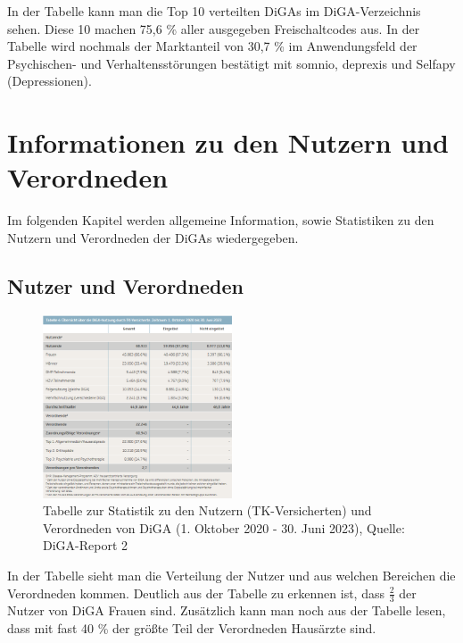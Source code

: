 \documentclass{article}
\begin{document}
			In der Tabelle kann man die Top 10 verteilten DiGAs im DiGA-Verzeichnis sehen. Diese 10 machen 75,6 \% aller ausgegeben Freischaltcodes aus. In der Tabelle wird nochmals der Marktanteil von 30,7 \% im Anwendungsfeld der Psychischen- und Verhaltensstörungen bestätigt mit somnio, deprexis und Selfapy (Depressionen).  
	
	\section{Informationen zu den Nutzern und Verordneden}
		Im folgenden Kapitel werden allgemeine Information, sowie Statistiken zu den Nutzern und Verordneden der DiGAs wiedergegeben.
		\subsection{Nutzer und Verordneden}
			\begin{figure}[htbp]
				\centering
				\includegraphics[width=0.5\textwidth]{./grafiken/tabelle_nutzung_versicherte_diga}
				\caption[Statistik zu den Nutzern (TK-Versicherten) und Verordneden von DiGA]{Tabelle zur Statistik zu den Nutzern (TK-Versicherten) und Verordneden von DiGA (1. Oktober 2020 - 30. Juni 2023), Quelle: DiGA-Report 2 \cite{TK-Report-2}}
				\label{Tab-nutzung-versicherte-diga}
			\end{figure}
			In der Tabelle sieht man die Verteilung der Nutzer und aus welchen Bereichen die Verordneden kommen. Deutlich aus der Tabelle zu erkennen ist, dass $\frac{2}{3}$ der Nutzer von DiGA Frauen sind. Zusätzlich kann man noch aus der Tabelle lesen, dass mit fast 40 \% der größte Teil der Verordneden Hausärzte sind.\par
			
\end{document}

